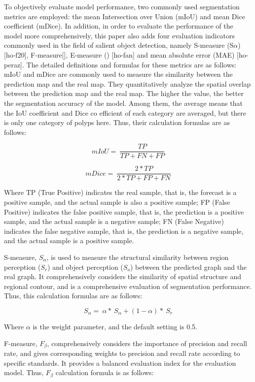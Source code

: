 To objectively evaluate model performance, two commonly used
segmentation metrics are employed: the mean Intersection over Union
(mIoU) and mean Dice coefficient (mDice). In addition, in order to
evaluate the performance of the model more comprehensively, this paper
also adds four evaluation indicators commonly used in the field of
salient object detection, namely S-measure (S$\alpha$) {[}ho-f20{]},
F-measure{[}{]}, E-measure () {[}ho-fan{]} and mean absolute error (MAE)
{[}ho-peraz{]}. The detailed definitions and formulas for these metrics
are as follows: mIoU and mDice are commonly used to measure the
similarity between the prediction map and the real map. They
quantitatively analyze the spatial overlap between the prediction map
and the real map. The higher the value, the better the segmentation
accuracy of the model. Among them, the average means that the IoU
coefficient and Dice co efficient of each category are averaged, but
there is only one category of polyps here. Thus, their calculation
formulas are as follows:

\[mIoU = \ \frac{TP}{TP + FN + FP}\]

\[mDice = \ \frac{2*TP}{2*TP + FP + FN}\]

Where TP (True Positive) indicates the real sample, that is, the
forecast is a positive sample, and the actual sample is also a positive
sample; FP (False Positive) indicates the false positive sample, that
is, the prediction is a positive sample, and the actual sample is a
negative sample; FN (False Negative) indicates the false negative
sample, that is, the prediction is a negative sample, and the actual
sample is a positive sample.

S-measure, \(S_{\alpha}\), is used to measure the structural similarity
between region perception (\(S_{r}\)) and object perception (\(S_{o}\))
between the predicted graph and the real graph. It comprehensively
considers the similarity of spatial structure and regional contour, and
is a comprehensive evaluation of segmentation performance. Thus, this
calculation formulas are as follows:

\[S_{\alpha} = \ \alpha*\ S_{\alpha} + (1 - \alpha)*\ S_{r}\]

Where $\alpha$ is the weight parameter, and the default setting is 0.5.

F-measure, \(F_{\beta}\), comprehensively considers the importance of
precision and recall rate, and gives corresponding weights to precision
and recall rate according to specific standards. It provides a balanced
evaluation index for the evaluation model. Thus, \(F_{\beta}\)
calculation formula is as follows:

